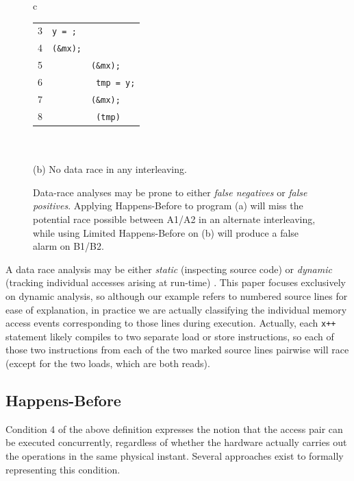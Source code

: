 \begin{figure}[h]
\begin{center}
\begin{tabular}{c}
\begin{tabular}{rll}
	3 & \texttt{y = \const{true};} & \\
	4 & \texttt{\call{mutex\_unlock}(\&mx);} & \\
	5 & & \texttt{\call{mutex\_lock}(\&mx);} \\
	6 & & \texttt{\ctype{bool} tmp = y;} \\
	7 & & \texttt{\call{mutex\_unlock}(\&mx);} \\
	8 & & \texttt{\flow{if} (tmp) \hilight{brickred}{x++;}~\ccomment{// B2}} \\
\end{tabular}
\\
\\
{\normalsize (b) No data race in any interleaving.}
\end{tabular}
	\end{center}
	\caption[Data-race analyses may be prone to either {\em false negatives} or {\em false positives}.]
		{{Data-race analyses may be prone to either {\em false negatives} or {\em false positives}.
	Applying Happens-Before to program (a) will miss the potential race possible between A1/A2 in an alternate interleaving,
	while using Limited Happens-Before on (b) will produce a false alarm on B1/B2.}}
\label{fig:hb-example}
\end{figure}

A data race analysis may be either {\em static} (inspecting source code) \cite{racerx} or {\em dynamic} (tracking individual accesses arising at run-time) \cite{tsan}.
This paper focuses exclusively on dynamic analysis,
so although our example refers to numbered source lines for ease of explanation,
in practice we are actually classifying the individual memory access events corresponding to those lines during execution.
Actually, each {\tt x++} statement likely compiles to two separate load or store instructions, so each of those two instructions from each of the two marked source lines pairwise will race (except for the two loads, which are both reads).

\subsection{Happens-Before}
\label{sec:background-hb}

Condition 4 of the above definition expresses the notion that the access pair can be executed concurrently,
regardless of whether the hardware actually carries out the operations in the same physical instant.
Several approaches exist to formally representing this condition.

